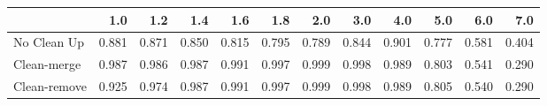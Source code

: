 \begin{tabular}{lrrrrrrrrrrr}
\toprule
{} &   1.0 &   1.2 &   1.4 &   1.6 &   1.8 &   2.0 &   3.0 &   4.0 &   5.0 &   6.0 &   7.0 \\
\midrule
No Clean Up  & 0.881 & 0.871 & 0.850 & 0.815 & 0.795 & 0.789 & 0.844 & 0.901 & 0.777 & 0.581 & 0.404 \\
Clean-merge  & 0.987 & 0.986 & 0.987 & 0.991 & 0.997 & 0.999 & 0.998 & 0.989 & 0.803 & 0.541 & 0.290 \\
Clean-remove & 0.925 & 0.974 & 0.987 & 0.991 & 0.997 & 0.999 & 0.998 & 0.989 & 0.805 & 0.540 & 0.290 \\
\bottomrule
\end{tabular}
